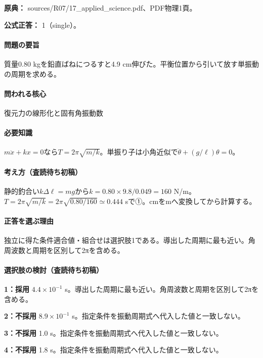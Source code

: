 \noindent\textbf{原典：} sources/R07/17\_applied\_science.pdf、PDF物理1頁。

\textbf{公式正答：} 1（single）。

\paragraph{問題の要旨} 質量0.80 kgを鉛直ばねにつるすと4.9 cm伸びた。平衡位置から引いて放す単振動の周期を求める。

\paragraph{問われる核心} 復元力の線形化と固有角振動数

\paragraph{必要知識} \(m\ddot x+kx=0\)なら\(T=2\pi\sqrt{m/k}\)。単振り子は小角近似で\(\ddot\theta+(g/\ell)\theta=0\)。

\paragraph{考え方（査読待ち初稿）} 静的釣合い\(k\Delta\ell=mg\)から\(k=0.80\times9.8/0.049=160\) N/m。\(T=2\pi\sqrt{m/k}=2\pi\sqrt{0.80/160}\simeq0.444\) sで①。cmをmへ変換してから計算する。

\paragraph{正答を選ぶ理由} 独立に得た条件適合値・組合せは選択肢1である。導出した周期に最も近い。角周波数と周期を区別して2πを含める。

\paragraph{選択肢の検討（査読待ち初稿）}

\noindent\textbf{1：採用} \(4.4\times10^{-1}\) s。導出した周期に最も近い。角周波数と周期を区別して2πを含める。\par

\noindent\textbf{2：不採用} \(8.9\times10^{-1}\) s。指定条件を振動周期式へ代入した値と一致しない。\par

\noindent\textbf{3：不採用} 1.0 s。指定条件を振動周期式へ代入した値と一致しない。\par

\noindent\textbf{4：不採用} 1.8 s。指定条件を振動周期式へ代入した値と一致しない。\par

